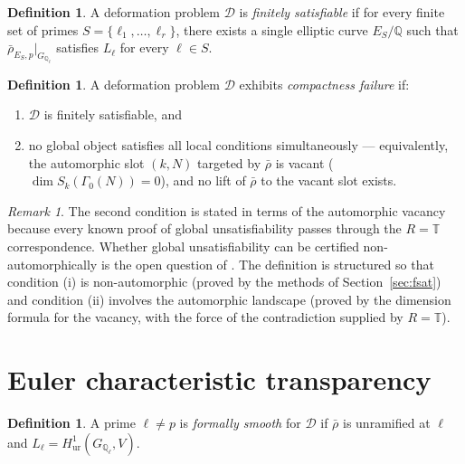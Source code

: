 \documentclass[12pt]{amsart}
\theoremstyle{definition}
\newtheorem{definition}[theorem]{Definition}
\theoremstyle{remark}
\newtheorem{remark}[theorem]{Remark}
\newcommand{\rhobar}{\bar{\rho}}
\newcommand{\GQl}{G_{\mathbb{Q}_\ell}}
\begin{document}
\begin{definition}\label{def:fin-sat}
A deformation problem $\mathcal{D}$ is \emph{finitely satisfiable} if for every finite set of primes $S = \{\ell_1, \ldots, \ell_r\}$, there exists a single elliptic curve $E_S / \mathbb{Q}$ such that $\rhobar_{E_S, p}|_{\GQl}$ satisfies $L_\ell$ for every $\ell \in S$.
\end{definition}

\begin{definition}\label{def:compactness-failure}
A deformation problem $\mathcal{D}$ exhibits \emph{compactness failure} if:
\begin{enumerate}[label=(\roman*)]
\item $\mathcal{D}$ is finitely satisfiable, and
\item no global object satisfies all local conditions simultaneously --- equivalently, the automorphic slot $(k, N)$ targeted by $\rhobar$ is vacant ($\dim S_k(\Gamma_0(N)) = 0$), and no lift of $\rhobar$ to the vacant slot exists.
\end{enumerate}
\end{definition}

\begin{remark}
The second condition is stated in terms of the automorphic vacancy because every known proof of global unsatisfiability passes through the $R = \mathbb{T}$ correspondence. Whether global unsatisfiability can be certified non-automorphically is the open question of \cite{Author-synthesis}. The definition is structured so that condition (i) is non-automorphic (proved by the methods of Section~\ref{sec:fsat}) and condition (ii) involves the automorphic landscape (proved by the dimension formula for the vacancy, with the force of the contradiction supplied by $R = \mathbb{T}$).
\end{remark}

\section{Euler characteristic transparency}
\label{sec:transparency}

\begin{definition}\label{def:formally-smooth}
A prime $\ell \neq p$ is \emph{formally smooth} for $\mathcal{D}$ if $\rhobar$ is unramified at $\ell$ and $L_\ell = H^1_{\mathrm{ur}}(\GQl, V)$.
\end{definition}
\end{document}
